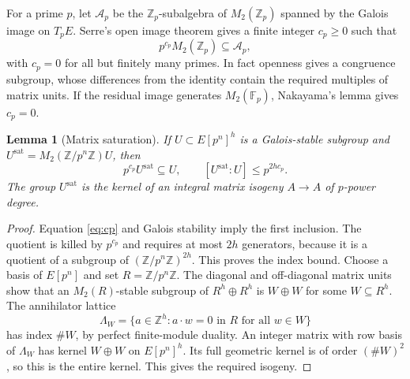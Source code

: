 \documentclass[11pt,a4paper]{article}
\newtheorem{lemma}[theorem]{Lemma}
\theoremstyle{definition}\newtheorem{definition}[theorem]{Definition}
\theoremstyle{remark}\newtheorem{remark}[theorem]{Remark}
\newcommand{\ZZ}{\mathbb Z}\newcommand{\QQ}{\mathbb Q}\newcommand{\FF}{\mathbb F}
\numberwithin{equation}{section}
\begin{document}
For a prime $p$, let $\mathcal A_p$ be the $\ZZ_p$-subalgebra of $M_2(\ZZ_p)$ spanned by the Galois image on $T_pE$. Serre's open image theorem \cite{Serre} gives a finite integer $c_p\geq0$ such that
\begin{equation}\label{eq:cp}
p^{c_p}M_2(\ZZ_p)\subseteq\mathcal A_p,
\end{equation}
with $c_p=0$ for all but finitely many primes. In fact openness gives a congruence subgroup, whose differences from the identity contain the required multiples of matrix units. If the residual image generates $M_2(\FF_p)$, Nakayama's lemma gives $c_p=0$.
\begin{lemma}[Matrix saturation]\label{lem:sat}
If $U\subset E[p^n]^h$ is a Galois-stable subgroup and $U^{\mathrm{sat}}=M_2(\ZZ/p^n\ZZ)U$, then
\[
p^{c_p}U^{\mathrm{sat}}\subseteq U,\qquad [U^{\mathrm{sat}}:U]\leq p^{2hc_p}.
\]
The group $U^{\mathrm{sat}}$ is the kernel of an integral matrix isogeny $A\to A$ of $p$-power degree.
\end{lemma}
\begin{proof}
Equation \eqref{eq:cp} and Galois stability imply the first inclusion. The quotient is killed by $p^{c_p}$ and requires at most $2h$ generators, because it is a quotient of a subgroup of $(\ZZ/p^n\ZZ)^{2h}$. This proves the index bound. Choose a basis of $E[p^n]$ and set $R=\ZZ/p^n\ZZ$. The diagonal and off-diagonal matrix units show that an $M_2(R)$-stable subgroup of $R^h\oplus R^h$ is $W\oplus W$ for some $W\subseteq R^h$. The annihilator lattice
\[
\Lambda_W=\{a\in\ZZ^h:a\cdot w=0\text{ in }R\text{ for all }w\in W\}
\]
has index $\#W$, by perfect finite-module duality. An integer matrix with row basis of $\Lambda_W$ has kernel $W\oplus W$ on $E[p^n]^h$. Its full geometric kernel is of order $(\#W)^2$, so this is the entire kernel. This gives the required isogeny.
\end{proof}
\end{document}
